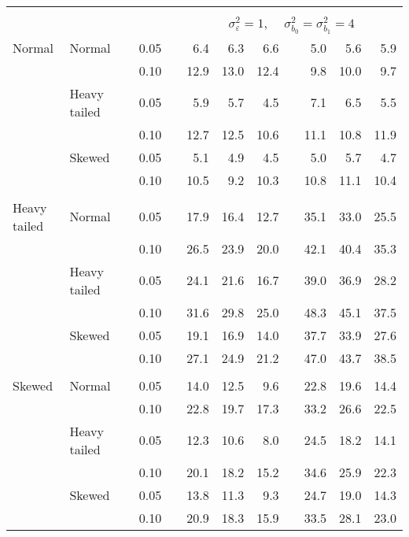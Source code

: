 \begin{table}[ht]
\begin{scriptsize}
\begin{tabular}{ll p{.1cm} c p{.1cm} rrr p{.1cm} rrr}
&&&&&&&&&&&\\
& && && \multicolumn{7}{c}{$\sigma_{\varepsilon}^2 = 1$, \ \ $\sigma_{b_0}^2 = \sigma_{b_1}^2 = 4$} \\ \cline{6-12}
\rowcolor{gray!20} Normal & Normal &  & 0.05 &  & 6.4 & 6.3 & 6.6 &  & 5.0 & 5.6 & 5.9 \\ 
\rowcolor{gray!20}    &  &  & 0.10 &  & 12.9 & 13.0 & 12.4 &  & 9.8 & 10.0 & 9.7 \\ 
\rowcolor{gray!20}    & Heavy tailed &  & 0.05 &  & 5.9 & 5.7 & 4.5 &  & 7.1 & 6.5 & 5.5 \\ 
\rowcolor{gray!20}    &  &  & 0.10 &  & 12.7 & 12.5 & 10.6 &  & 11.1 & 10.8 & 11.9 \\ 
\rowcolor{gray!20}    & Skewed &  & 0.05 &  & 5.1 & 4.9 & 4.5 &  & 5.0 & 5.7 & 4.7 \\ 
\rowcolor{gray!20}    &  &  & 0.10 &  & 10.5 & 9.2 & 10.3 &  & 10.8 & 11.1 & 10.4 \\ 
&&&&&&&&&&&\\
  Heavy tailed & Normal &  & 0.05 &  & 17.9 & 16.4 & 12.7 &  & 35.1 & 33.0 & 25.5 \\ 
   &  &  & 0.10 &  & 26.5 & 23.9 & 20.0 &  & 42.1 & 40.4 & 35.3 \\ 
   & Heavy tailed &  & 0.05 &  & 24.1 & 21.6 & 16.7 &  & 39.0 & 36.9 & 28.2 \\ 
   &  &  & 0.10 &  & 31.6 & 29.8 & 25.0 &  & 48.3 & 45.1 & 37.5 \\ 
   & Skewed &  & 0.05 &  & 19.1 & 16.9 & 14.0 &  & 37.7 & 33.9 & 27.6 \\ 
   &  &  & 0.10 &  & 27.1 & 24.9 & 21.2 &  & 47.0 & 43.7 & 38.5 \\ 
&&&&&&&&&&&\\
  Skewed & Normal &  & 0.05 &  & 14.0 & 12.5 & 9.6 &  & 22.8 & 19.6 & 14.4 \\ 
   &  &  & 0.10 &  & 22.8 & 19.7 & 17.3 &  & 33.2 & 26.6 & 22.5 \\ 
   & Heavy tailed &  & 0.05 &  & 12.3 & 10.6 & 8.0 &  & 24.5 & 18.2 & 14.1 \\ 
   &  &  & 0.10 &  & 20.1 & 18.2 & 15.2 &  & 34.6 & 25.9 & 22.3 \\ 
   & Skewed &  & 0.05 &  & 13.8 & 11.3 & 9.3 &  & 24.7 & 19.0 & 14.3 \\ 
   &  &  & 0.10 &  & 20.9 & 18.3 & 15.9 &  & 33.5 & 28.1 & 23.0 \\ 

\hline
\end{tabular}
\end{scriptsize}
\end{table}



